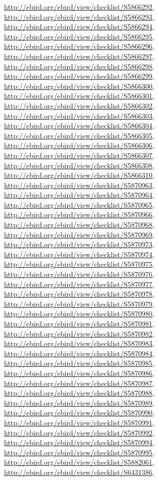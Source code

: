 \documentclass[9pt, article]{memoir}
\begin{document}
\begin{multicols}{2}
\url{http://ebird.org/ebird/view/checklist/S5866292}, 
\url{http://ebird.org/ebird/view/checklist/S5866293}, 
\url{http://ebird.org/ebird/view/checklist/S5866294}, 
\url{http://ebird.org/ebird/view/checklist/S5866295}, 
\url{http://ebird.org/ebird/view/checklist/S5866296}, 
\url{http://ebird.org/ebird/view/checklist/S5866297}, 
\url{http://ebird.org/ebird/view/checklist/S5866298}, 
\url{http://ebird.org/ebird/view/checklist/S5866299}, 
\url{http://ebird.org/ebird/view/checklist/S5866300}, 
\url{http://ebird.org/ebird/view/checklist/S5866301}, 
\url{http://ebird.org/ebird/view/checklist/S5866302}, 
\url{http://ebird.org/ebird/view/checklist/S5866303}, 
\url{http://ebird.org/ebird/view/checklist/S5866304}, 
\url{http://ebird.org/ebird/view/checklist/S5866305}, 
\url{http://ebird.org/ebird/view/checklist/S5866306}, 
\url{http://ebird.org/ebird/view/checklist/S5866307}, 
\url{http://ebird.org/ebird/view/checklist/S5866308}, 
\url{http://ebird.org/ebird/view/checklist/S5866310}, 
\url{http://ebird.org/ebird/view/checklist/S5870963}, 
\url{http://ebird.org/ebird/view/checklist/S5870964}, 
\url{http://ebird.org/ebird/view/checklist/S5870965}, 
\url{http://ebird.org/ebird/view/checklist/S5870966}, 
\url{http://ebird.org/ebird/view/checklist/S5870968}, 
\url{http://ebird.org/ebird/view/checklist/S5870969}, 
\url{http://ebird.org/ebird/view/checklist/S5870973}, 
\url{http://ebird.org/ebird/view/checklist/S5870974}, 
\url{http://ebird.org/ebird/view/checklist/S5870975}, 
\url{http://ebird.org/ebird/view/checklist/S5870976}, 
\url{http://ebird.org/ebird/view/checklist/S5870977}, 
\url{http://ebird.org/ebird/view/checklist/S5870978}, 
\url{http://ebird.org/ebird/view/checklist/S5870979}, 
\url{http://ebird.org/ebird/view/checklist/S5870980}, 
\url{http://ebird.org/ebird/view/checklist/S5870981}, 
\url{http://ebird.org/ebird/view/checklist/S5870982}, 
\url{http://ebird.org/ebird/view/checklist/S5870983}, 
\url{http://ebird.org/ebird/view/checklist/S5870984}, 
\url{http://ebird.org/ebird/view/checklist/S5870985}, 
\url{http://ebird.org/ebird/view/checklist/S5870986}, 
\url{http://ebird.org/ebird/view/checklist/S5870987}, 
\url{http://ebird.org/ebird/view/checklist/S5870988}, 
\url{http://ebird.org/ebird/view/checklist/S5870989}, 
\url{http://ebird.org/ebird/view/checklist/S5870990}, 
\url{http://ebird.org/ebird/view/checklist/S5870991}, 
\url{http://ebird.org/ebird/view/checklist/S5870992}, 
\url{http://ebird.org/ebird/view/checklist/S5870994}, 
\url{http://ebird.org/ebird/view/checklist/S5870995}, 
\url{http://ebird.org/ebird/view/checklist/S5882061}, 
\url{http://ebird.org/ebird/view/checklist/S6431386}, 

\end{multicols}
\end{document}
